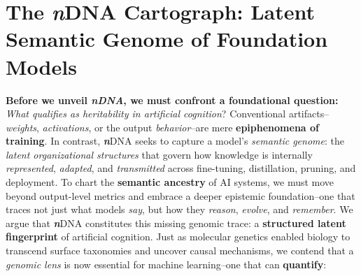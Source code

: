 

\section{The \textbf{\textit{n}}{\selectfont DNA} Cartograph: Latent Semantic Genome of Foundation Models}
\label{sec:ndna_score}

\noindent
\textbf{Before we unveil \textit{\emph{n}DNA}, we must confront a foundational question:} \emph{What qualifies as heritability in artificial cognition}? Conventional artifacts--\textit{weights}, \textit{activations}, or the output \textit{behavior}--are mere \textbf{epiphenomena of training}. In contrast, \textbf{\textit{n}}\textnormal{DNA} seeks to capture a model’s \emph{semantic genome}: the \textit{latent organizational structures} that govern how knowledge is internally \emph{represented}, \emph{adapted}, and \emph{transmitted} across fine-tuning, distillation, pruning, and deployment. To chart the \textbf{semantic ancestry} of AI systems, we must move beyond output-level metrics and embrace a deeper epistemic foundation--one that traces not just what models \emph{say}, but how they \emph{reason}, \emph{evolve}, and \emph{remember}. We argue that \textbf{\textit{n}}\textnormal{DNA} constitutes this missing genomic trace: a \textbf{structured latent fingerprint} of artificial cognition. Just as molecular genetics enabled biology to transcend surface taxonomies and uncover causal mechanisms, we contend that a \textit{genomic lens} is now essential for machine learning--one that can \textbf{quantify}:


